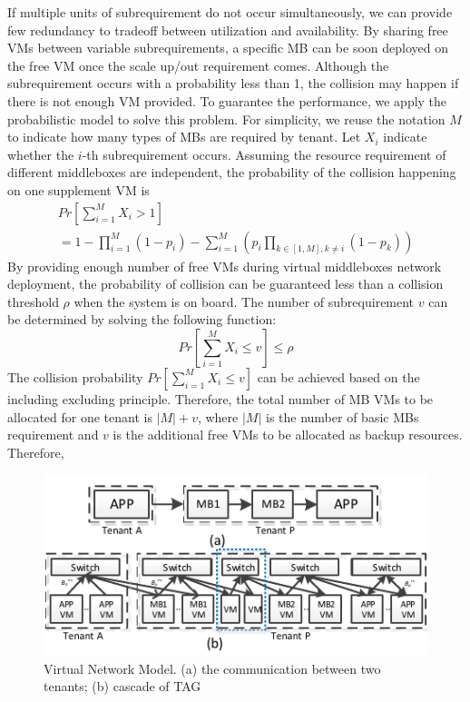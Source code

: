 \documentclass[review]{elsarticle}
\begin{document}
If multiple units of subrequirement do not occur simultaneously, we can provide few redundancy to tradeoff between utilization and availability. By sharing free VMs between variable subrequirements, a specific MB can be soon deployed on the free VM once the scale up/out requirement comes. Although the subrequirement occurs with a probability less than 1, the collision may happen if there is not enough VM provided. To guarantee the performance, we apply the probabilistic model to solve this problem. For simplicity, we reuse the notation $M$ to indicate how many types of MBs are required by tenant. Let $X_{i}$ indicate whether the $i$-th subrequirement occurs. Assuming the resource requirement of different middleboxes are independent, the probability of the collision happening on one supplement VM is
\begin{align}
&Pr\left[ \sum_{i=1}^{M} X_{i} > 1 \right] & \nonumber \\
&= 1-\prod_{i=1}^{M}(1-p_{i})-\sum_{i=1}^{M}\left(p_{i}\prod_{k\in[1,M], k\neq i}(1-p_{k})\right)&
\end{align}
By providing enough number of free VMs during virtual middleboxes network deployment, the probability of collision can be guaranteed less than a collision threshold $\rho$ when the system is on board. The number of subrequirement $v$ can be determined by solving the following function:
\begin{equation}\label{equ:collision}  
		Pr\left[ \sum_{i=1}^{M} X_{i} \leq v \right] \leq \rho
\end{equation}
The collision probability $Pr\left[ \sum_{i=1}^{M} X_{i} \leq v \right]$ can be achieved based on the including excluding principle. Therefore, the total number of MB VMs to be allocated for one tenant is $|M|+v$, where $|M|$ is the number of basic MBs requirement and $v$ is the additional free VMs to be allocated as backup resources. Therefore, 

\begin{figure}
	\centering
		\includegraphics[width=3.3 in]{fig/scalability.pdf}
	\caption{Virtual Network Model. (a) the communication between two tenants; (b) cascade of TAG}
	\label{fig:scalability}
\end{figure}
\end{document}
